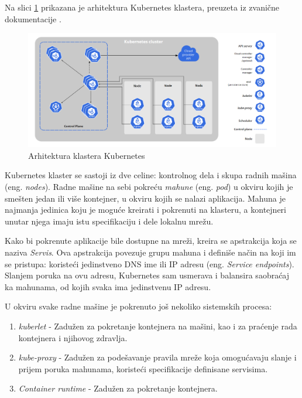 \documentclass[12pt,oneside]{memoir}
\begin{document}
Na slici \ref{fig:kubernetesarh} prikazana je arhitektura Kubernetes klastera, preuzeta iz zvanične dokumentacije \cite{KubernetesArchitecture}.

\begin{figure}[!ht]
  \centering
  \includegraphics[width=1.0\textwidth]{./images/kubernetes_architecture.png}
  \caption{Arhitektura klastera Kubernetes}
  \label{fig:kubernetesarh}
\end{figure}

Kubernetes klaster se sastoji iz dve celine: kontrolnog dela i skupa radnih mašina (eng. \emph{nodes}). Radne mašine na sebi pokreću \emph{mahune} (eng. \emph{pod}) u okviru kojih je smešten jedan ili više kontejner, u okviru kojih se nalazi aplikacija. Mahuna je najmanja jedinica koju je moguće kreirati i pokrenuti na klasteru, a kontejneri unutar njega imaju istu specifikaciju i dele lokalnu mrežu.

Kako bi pokrenute aplikacije bile dostupne na mreži, kreira se apstrakcija koja se naziva \emph{Servis}. Ova apstrakcija povezuje grupu mahuna i definiše način na koji im se pristupa: koristeći jedinstveno DNS ime ili IP adresu (eng. \emph{Service endpoints}). Slanjem poruka na ovu adresu, Kubernetes sam usmerava i balansira saobraćaj ka mahunama, od kojih svaka ima jedinstvenu IP adresu.

U okviru svake radne mašine je pokrenuto još nekoliko sistemskih procesa: 
\begin{enumerate}
\item \emph{kuberlet} - Zadužen za pokretanje kontejnera na mašini, kao i za praćenje rada kontejnera i njihovog zdravlja.
\item \emph{kube-proxy} - Zadužen za podešavanje pravila mreže koja omogućavaju slanje i prijem poruka mahunama, koristeći specifikacije definisane servisima.
\item \emph{Container runtime} - Zadužen za pokretanje kontejnera.
\end{enumerate}
\end{document}
